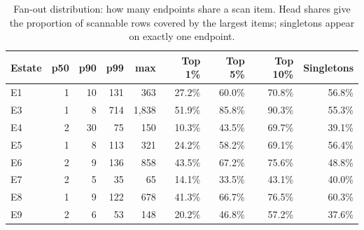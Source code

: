 \begin{table}[htbp]
\centering
\caption{Fan-out distribution: how many endpoints share a scan item. Head shares give the proportion of scannable rows covered by the largest items; singletons appear on exactly one endpoint.}
\label{tab:fanout}
\footnotesize
\begin{tabular}{l r r r r r r r r}
\hline
Estate & p50 & p90 & p99 & max & Top 1\% & Top 5\% & Top 10\% & Singletons \\
\hline
E1 & 1 & 10 & 131 & 363 & 27.2\% & 60.0\% & 70.8\% & 56.8\% \\
E3 & 1 & 8 & 714 & 1,838 & 51.9\% & 85.8\% & 90.3\% & 55.3\% \\
E4 & 2 & 30 & 75 & 150 & 10.3\% & 43.5\% & 69.7\% & 39.1\% \\
E5 & 1 & 8 & 113 & 321 & 24.2\% & 58.2\% & 69.1\% & 56.4\% \\
E6 & 2 & 9 & 136 & 858 & 43.5\% & 67.2\% & 75.6\% & 48.8\% \\
E7 & 2 & 5 & 35 & 65 & 14.1\% & 33.5\% & 43.1\% & 40.0\% \\
E8 & 1 & 9 & 122 & 678 & 41.3\% & 66.7\% & 76.5\% & 60.3\% \\
E9 & 2 & 6 & 53 & 148 & 20.2\% & 46.8\% & 57.2\% & 37.6\% \\
\hline
\end{tabular}
\end{table}
